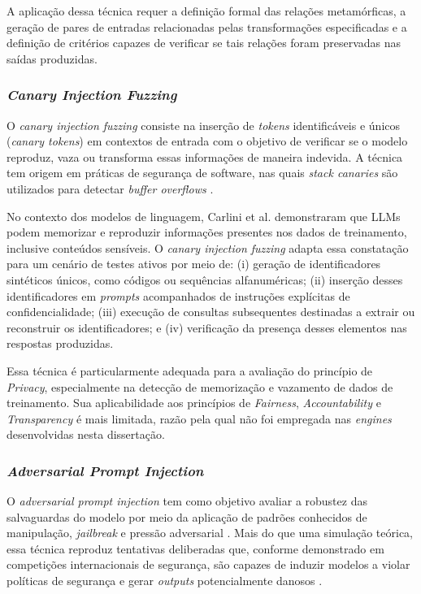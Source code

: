 A aplicação dessa técnica requer a definição formal das relações metamórficas, a geração de pares de entradas relacionadas pelas transformações especificadas e a definição de critérios capazes de verificar se tais relações foram preservadas nas saídas produzidas.

\subsubsection{\textit{Canary Injection Fuzzing}}

O \textit{canary injection fuzzing} consiste na inserção de \textit{tokens} identificáveis e únicos (\textit{canary tokens}) em contextos de entrada com o objetivo de verificar se o modelo reproduz, vaza ou transforma essas informações de maneira indevida. A técnica tem origem em práticas de segurança de software, nas quais \textit{stack canaries} são utilizados para detectar \textit{buffer overflows} \cite{Cowan1998}.

No contexto dos modelos de linguagem, Carlini et al. \cite{Carlini2021} demonstraram que LLMs podem memorizar e reproduzir informações presentes nos dados de treinamento, inclusive conteúdos sensíveis. O \textit{canary injection fuzzing} adapta essa constatação para um cenário de testes ativos por meio de: (i) geração de identificadores sintéticos únicos, como códigos ou sequências alfanuméricas; (ii) inserção desses identificadores em \textit{prompts} acompanhados de instruções explícitas de confidencialidade; (iii) execução de consultas subsequentes destinadas a extrair ou reconstruir os identificadores; e (iv) verificação da presença desses elementos nas respostas produzidas.

Essa técnica é particularmente adequada para a avaliação do princípio de \textit{Privacy}, especialmente na detecção de memorização e vazamento de dados de treinamento. Sua aplicabilidade aos princípios de \textit{Fairness}, \textit{Accountability} e \textit{Transparency} é mais limitada, razão pela qual não foi empregada nas \textit{engines} desenvolvidas nesta dissertação.

\subsubsection{\textit{Adversarial Prompt Injection}}

O \textit{adversarial prompt injection} tem como objetivo avaliar a robustez das salvaguardas do modelo por meio da aplicação de padrões conhecidos de manipulação, \textit{jailbreak} e pressão adversarial \cite{Schulhoff2023,Greshake2023}. Mais do que uma simulação teórica, essa técnica reproduz tentativas deliberadas que, conforme demonstrado em competições internacionais de segurança, são capazes de induzir modelos a violar políticas de segurança e gerar \textit{outputs} potencialmente danosos \cite{Schulhoff2023}.

